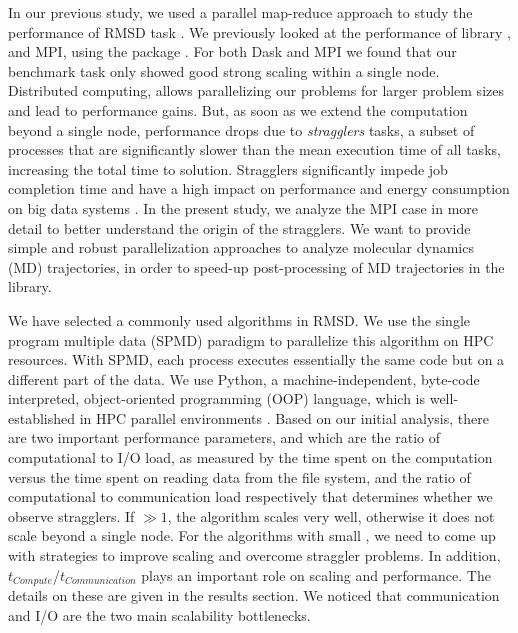 In our previous study, we used a parallel map-reduce approach to study the performance of RMSD task \cite{Khoshlessan:2017ab, ICCP-2018}. 
We previously looked at the performance of  library \cite{Rocklin:2015aa}, and MPI, using the  package \cite{Dalcin:2011aa, Dalcin:2005aa}. 
For both Dask and MPI we found that our benchmark task only showed good strong scaling within a single node.
Distributed computing, allows parallelizing our problems for larger problem sizes and lead to performance gains.
But, as soon as we extend the computation beyond a single node, performance drops due to \emph{stragglers} tasks, a subset of processes that are significantly slower than the mean execution time of all tasks, increasing the total time to solution.
Stragglers significantly impede job completion time \cite{Garraghan2016} and have a high impact on performance and energy consumption on big data systems \cite{Tien-2017}.
In the present study, we analyze the MPI case in more detail to better understand the origin of the stragglers.
We want to provide simple and robust parallelization approaches to analyze molecular dynamics (MD) trajectories, in order to speed-up post-processing of MD trajectories in the  library. 

We have selected a commonly used algorithms in  RMSD.
We use the single program multiple data (SPMD) paradigm to parallelize this algorithm on HPC resources.
With SPMD, each process executes essentially the same code but on a different part of the data. 
We use Python, a machine-independent, byte-code interpreted, object-oriented programming (OOP) language, which is well-established in HPC parallel environments \cite{GAiN}. 
Based on our initial analysis, there are two important performance parameters,  and  which are the ratio of computational to I/O load, as measured by the time spent on the computation versus the time spent on reading data from the file system, and the ratio of computational to communication load respectively that determines whether we observe stragglers.
If   $\gg 1$, the algorithm scales very well, otherwise it does not scale beyond a single node.  
For the algorithms with small , we need to come up with strategies to improve scaling and overcome straggler problems.
In addition, $t_{Compute}$/$t_{Communication}$ plays an important role on scaling and performance.   
The details on these are given in the results section. 
We noticed that communication and I/O are the two main scalability bottlenecks.

